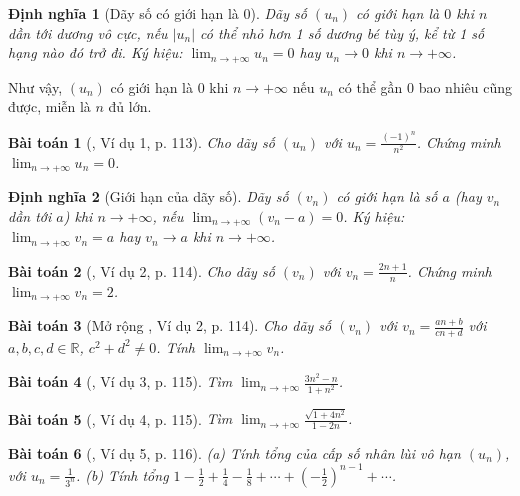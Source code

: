\documentclass{article}
\newtheorem{baitoan}{Bài toán}
\newtheorem{dinhnghia}{Định nghĩa}
\begin{document}
\begin{dinhnghia}[Dãy số có giới hạn là 0]
	Dãy số $(u_n)$ \emph{có giới hạn là $0$} khi $n$ dần tới dương vô cực, nếu $|u_n|$ có thể nhỏ hơn 1 số dương bé tùy ý, kể từ 1 số hạng nào đó trở đi. Ký hiệu: $\lim_{n\to+\infty} u_n = 0$ hay $u_n\to0$ khi $n\to+\infty$.
\end{dinhnghia}
Như vậy, $(u_n)$ có giới hạn là 0 khi $n\to+\infty$ nếu $u_n$ có thể gần 0 bao nhiêu cũng được, miễn là $n$ đủ lớn.

\begin{baitoan}[\cite{SGK_Toan_11_dai_so_giai_tich_co_ban}, Ví dụ 1, p. 113]
	Cho dãy số $(u_n)$ với $u_n = \frac{(-1)^n}{n^2}$. Chứng minh $\lim_{n\to+\infty} u_n = 0$.
\end{baitoan}

\begin{dinhnghia}[Giới hạn của dãy số]
	Dãy số $(v_n)$ có \emph{giới hạn} là số $a$ (hay $v_n$ dần tới $a$) khi $n\to+\infty$, nếu $\lim_{n\to+\infty} (v_n - a) = 0$. Ký hiệu: $\lim_{n\to+\infty} v_n = a$ hay $v_n\to a$ khi $n\to+\infty$.
\end{dinhnghia}

\begin{baitoan}[\cite{SGK_Toan_11_dai_so_giai_tich_co_ban}, Ví dụ 2, p. 114]
	Cho dãy số $(v_n)$ với $v_n = \frac{2n + 1}{n}$. Chứng minh $\lim_{n\to+\infty} v_n = 2$.
\end{baitoan}

\begin{baitoan}[Mở rộng \cite{SGK_Toan_11_dai_so_giai_tich_co_ban}, Ví dụ 2, p. 114]
	Cho dãy số $(v_n)$ với $v_n = \frac{an + b}{cn + d}$ với $a,b,c,d\in\mathbb{R}$, $c^2 + d^2\ne0$. Tính $\lim_{n\to+\infty} v_n$.
\end{baitoan}

\begin{baitoan}[\cite{SGK_Toan_11_dai_so_giai_tich_co_ban}, Ví dụ 3, p. 115]
	Tìm $\lim_{n\to+\infty} \frac{3n^2 - n}{1 + n^2}$.
\end{baitoan}

\begin{baitoan}[\cite{SGK_Toan_11_dai_so_giai_tich_co_ban}, Ví dụ 4, p. 115]
	Tìm $\lim_{n\to+\infty} \frac{\sqrt{1 + 4n^2}}{1 - 2n}$.
\end{baitoan}

\begin{baitoan}[\cite{SGK_Toan_11_dai_so_giai_tich_co_ban}, Ví dụ 5, p. 116]
	(a) Tính tổng của cấp số nhân lùi vô hạn $(u_n)$, với $u_n = \frac{1}{3^n}$. (b) Tính tổng $1 - \frac{1}{2} + \frac{1}{4} - \frac{1}{8} + \cdots + \left(-\frac{1}{2}\right)^{n-1} + \cdots$.
\end{baitoan}
\end{document}
